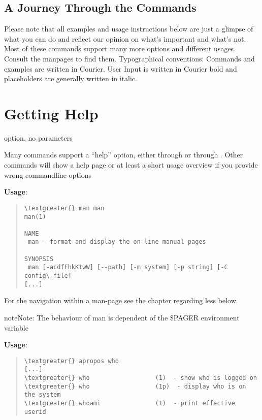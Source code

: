\documentclass[letterpaper,10pt,english]{sphinxmanual}
\begin{document}
\subsection{A Journey Through the Commands}
\label{introduction:a-journey-through-the-commands}
Please note that all examples and usage instructions below are just a glimpse of what you can do and reflect our opinion on what’s important and what’s not. Most of these commands support many more options and different usages. Consult the manpages to find them.
Typographical conventions: Commands and examples are written in Courier.  User Input is written in Courier bold and placeholders are generally written in italic.


\section{Getting Help}
\label{introduction:getting-help}
 option, no parameters

Many commands support a “help” option, either through  or through .
Other commands will show a help page or at least a short usage overview if you provide wrong commandline options

\textbf{Usage}:
\begin{quote}

\begin{Verbatim}[commandchars=\\\{\}]
\textgreater{} man man
man(1)

NAME
 man - format and display the on-line manual pages

SYNOPSIS
 man [-acdfFhkKtwW] [--path] [-m system] [-p string] [-C config\_file]
[...]
\end{Verbatim}
\end{quote}

For the navigation within a man-page see the chapter regarding less below.

\begin{notice}{note}{Note:}
The behaviour of man is dependent of the \$PAGER environment variable
\end{notice}

\textbf{Usage}: 
\begin{quote}

\begin{Verbatim}[commandchars=\\\{\}]
\textgreater{} apropos who
[...]
\textgreater{} who                  (1)  - show who is logged on
\textgreater{} who                  (1p)  - display who is on the system
\textgreater{} whoami               (1)  - print effective userid
\end{Verbatim}
\end{quote}
\end{document}

